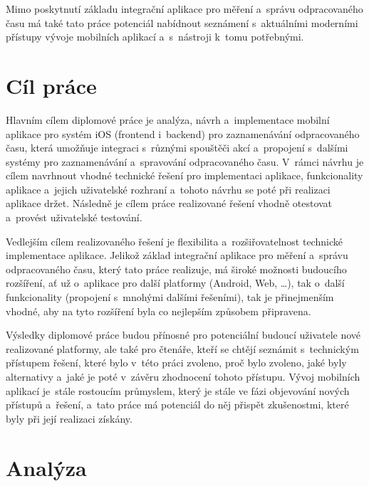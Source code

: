 Mimo poskytnutí základu integrační aplikace pro měření a~správu odpracovaného času má také tato práce potenciál nabídnout seznámení s~aktuálními moderními přístupy vývoje mobilních aplikací a~s~nástroji k~tomu potřebnými.

\chapter{Cíl práce}

Hlavním cílem diplomové práce je analýza, návrh a~implementace mobilní aplikace pro systém iOS (frontend i~backend) pro zaznamenávání odpracovaného času, která umožňuje integraci s~různými spouštěči akcí a~propojení s~dalšími systémy pro zaznamenávání a~spravování odpracovaného času. V~rámci návrhu je cílem navrhnout vhodné technické řešení pro implementaci aplikace, funkcionality aplikace a~jejich uživatelské rozhraní a~tohoto návrhu se poté při realizaci aplikace držet. Následně je cílem práce realizované řešení vhodně otestovat a~provést uživatelské testování. 

Vedlejším cílem realizovaného řešení je flexibilita a~rozšiřovatelnost technické implementace aplikace. Jelikož základ integrační aplikace pro měření a~správu odpracovaného času, který tato práce realizuje, má široké možnosti budoucího rozšíření, ať už o~aplikace pro další platformy (Android, Web, \dots), tak o~další funkcionality (propojení s~mnohými dalšími řešeními), tak je přinejmenším vhodné, aby na tyto rozšíření byla co nejlepším způsobem připravena.

Výsledky diplomové práce budou přínosné pro potenciální budoucí uživatele nové realizované platformy, ale také pro čtenáře, kteří se chtějí seznámit s~technickým přístupem řešení, které bylo v~této práci zvoleno, proč bylo zvoleno, jaké byly alternativy a~jaké je poté v~závěru zhodnocení tohoto přístupu. Vývoj mobilních aplikací je~stále rostoucím průmyslem, který je stále ve fázi objevování nových přístupů a~řešení, a~tato práce má potenciál do něj přispět zkušenostmi, které byly při její realizaci získány.

\chapter{Analýza}

